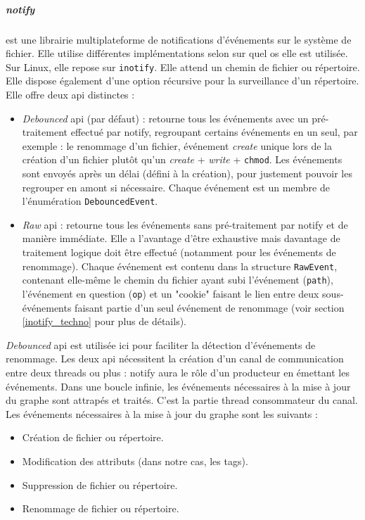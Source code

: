 \subparagraph{notify}\label{tag_engine_notify}
est une librairie multiplateforme de notifications d'événements sur le système de fichier. 
Elle utilise différentes implémentations selon sur quel \acrshort{os} elle est utilisée. Sur Linux, 
elle repose sur \texttt{inotify}. Elle attend un chemin de fichier ou répertoire. Elle 
dispose également d'une option récursive pour la surveillance d'un répertoire. Elle offre deux 
\acrshort{api} distinctes :
\begin{itemize}
    \item \textit{Debounced} \acrshort{api} (par défaut) : retourne tous les événements avec un 
        pré-traitement effectué par notify, regroupant certains événements en un seul, par exemple :
        le renommage d'un fichier, événement \textit{create} unique lors de la création d'un fichier 
        plutôt qu'un \textit{create} + \textit{write} + \texttt{chmod}. Les événements 
        sont envoyés après un délai (défini à la création), pour justement pouvoir les regrouper 
        en amont si nécessaire. Chaque événement est un membre de l'énumération \texttt{DebouncedEvent}.
    \item \textit{Raw} \acrshort{api} : retourne tous les événements sans pré-traitement par notify 
        et de manière immédiate. Elle a l'avantage d'être exhaustive mais davantage de traitement 
        logique doit être effectué (notamment pour les événements de renommage). Chaque événement 
        est contenu dans la structure \texttt{RawEvent}, contenant elle-même le chemin 
        du fichier ayant subi l'événement (\texttt{path}), l'événement en question 
        (\texttt{op}) et un "cookie" faisant le lien entre deux sous-événements faisant 
        partie d'un seul événement de renommage (voir section \ref{inotify_techno} pour plus de détails).
\end{itemize}
\textit{Debounced} \acrshort{api} est utilisée ici pour faciliter la détection d'événements de 
renommage. Les deux \acrshort{api} nécessitent la création d'un canal de communication entre deux 
threads ou plus : notify aura le rôle d'un producteur en émettant les événements. Dans une boucle 
infinie, les événements nécessaires à la mise à jour du graphe sont attrapés et traités. C'est la 
partie thread consommateur du canal. Les événements nécessaires à la mise à jour du graphe sont 
les suivants :
\begin{itemize}
    \item Création de fichier ou répertoire.
    \item Modification des attributs (dans notre cas, les tags).
    \item Suppression de fichier ou répertoire. 
    \item Renommage de fichier ou répertoire.
\end{itemize}
